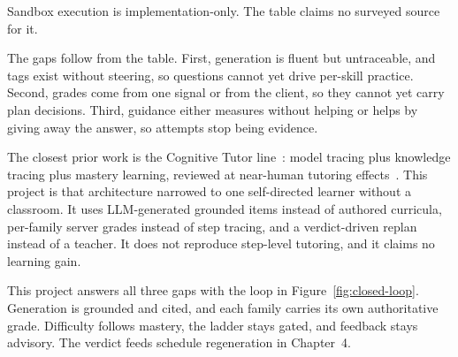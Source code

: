 Sandbox execution is implementation-only. The table claims no surveyed source for it.

The gaps follow from the table. First, generation is fluent but untraceable, and tags exist without steering, so questions cannot yet drive per-skill practice. Second, grades come from one signal or from the client, so they cannot yet carry plan decisions. Third, guidance either measures without helping or helps by giving away the answer, so attempts stop being evidence.

The closest prior work is the Cognitive Tutor line~\cite{anderson1995,koedinger2007}: model tracing plus knowledge tracing plus mastery learning, reviewed at near-human tutoring effects~\cite{vanlehn2011}. This project is that architecture narrowed to one self-directed learner without a classroom. It uses LLM-generated grounded items instead of authored curricula, per-family server grades instead of step tracing, and a verdict-driven replan instead of a teacher. It does not reproduce step-level tutoring, and it claims no learning gain.

This project answers all three gaps with the loop in Figure~\ref{fig:closed-loop}. Generation is grounded and cited, and each family carries its own authoritative grade. Difficulty follows mastery, the ladder stays gated, and feedback stays advisory. The verdict feeds schedule regeneration in Chapter~4.
